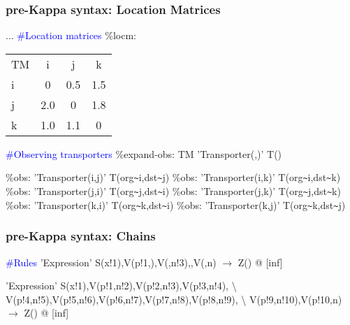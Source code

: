\documentclass[xcolor=dvipsnames]{beamer}
\def\int{\hbox{\texttt{\~}}}
\begin{document}
\begin{frame}
  \frametitle{pre-Kappa syntax: Location Matrices}
  \begin{flushleft} {\scriptsize
    ... \newline
    \textcolor{blue}{\#Location matrices} \newline
    \%locm: \newline
      \begin{tabular}{ l c c c }
        TM & i & j & k \\
        i & 0 & 0.5 & 1.5 \\ 
        j & 2.0 & 0 & 1.8 \\
        k & 1.0 & 1.1 & 0 \\
      \end{tabular}
    \item \textcolor{blue}{\#Observing transporters} \newline
    \%expand-obs: TM 'Transporter(,)' T() \pause
    \item {} \newline
    \%obs: 'Transporter(i,j)' T(org\int i,dst\int j) \newline
    \%obs: 'Transporter(i,k)' T(org\int i,dst\int k) \newline
    \%obs: 'Transporter(j,i)' T(org\int j,dst\int i) \newline
    \%obs: 'Transporter(j,k)' T(org\int j,dst\int k) \newline
    \%obs: 'Transporter(k,i)' T(org\int k,dst\int i) \newline
    \%obs: 'Transporter(k,j)' T(org\int k,dst\int j) \newline }
  \end{flushleft}
\end{frame}

\begin{frame}
  \frametitle{pre-Kappa syntax: Chains}
  \begin{flushleft} {\small
    \textcolor{blue}{\#Rules} \newline
    'Expression' S(x!1),V(p!1,),V(,n!3),,V(,n) $\rightarrow$ Z() @ [inf] } \newline \pause 
    \item {} \newline 
    'Expression' S(x!1),V(p!1,n!2),V(p!2,n!3),V(p!3,n!4), \textbackslash \newline
    V(p!4,n!5),V(p!5,n!6),V(p!6,n!7),V(p!7,n!8),V(p!8,n!9), \textbackslash \newline
    V(p!9,n!10),V(p!10,n) $\rightarrow$ Z() @ [inf]
  \end{flushleft}
\end{frame}
\end{document}
